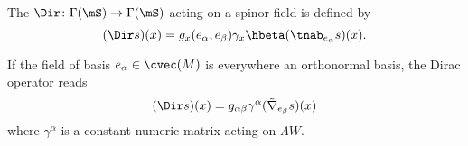 The  $\Dir\colon \Gamma(\mS)\to \Gamma(\mS)$ acting on a spinor field is defined by
\begin{equation}\label{dirac}
	(\Dir s)(x)=g_x(e_{\alpha},e_{\beta})\gamma_x\hbeta(\tnab_{e_{\alpha}}s)(x).
\end{equation}

\begin{proposition}		\label{PROPooUCECooOmdvmn}
	If the field of basis $e_{\alpha}\in\cvec(M)$ is everywhere an orthonormal basis, the Dirac operator reads
	\begin{equation}
		(\Dir s)(x)=g_{\alpha\beta}\gamma^{\alpha}(\tilde\nabla_{e_{\beta}}s)(x)
	\end{equation}
	where $\gamma^{\alpha}$ is a constant numeric matrix acting on $\Lambda W$.
\end{proposition}

